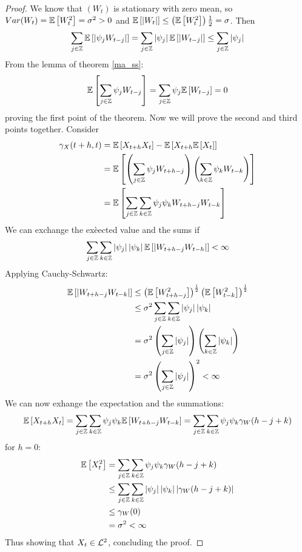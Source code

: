 \begin{proof}
    We know that $(W_t)$ is stationary with zero mean, so $Var(W_t)=\mathbb{E}\left[W_t^2\right]=\sigma^2>0$ and $\mathbb{E}\left[\left|W_t\right|\right]\le\left(\mathbb{E}\left[W_t^2\right]\right)\frac{1}{2}=\sigma$. Then
    \[
        \sum_{j\in\mathbb{Z}}\mathbb{E}\left[\left|\psi_jW_{t-j}\right|\right]=\sum_{j\in\mathbb{Z}}\left|\psi_j\right|\mathbb{E}\left[\left|W_{t-j}\right|\right]\le\sum_{j\in\mathbb{Z}}\left|\psi_j\right|  
    \]
    From the lemma of theorem \ref{ma_ss}:
    \[
        \mathbb{E}\left[\sum_{j\in\mathbb{Z}}\psi_jW_{t-j}\right]=\sum_{j\in\mathbb{Z}}\psi_j\mathbb{E}\left[W_{t-j}\right]=0  
    \]
    proving the first point of the theorem. Now we will prove the second and third points together. Consider
    \begin{equation*}
        \begin{split}
            \gamma_X(t+h,t)&=\mathbb{E}\left[X_{t+h}X_t\right]-\mathbb{E}\left[X_{t+h}\mathbb{E}\left[X_t\right]\right]\\
            &=\mathbb{E}\left[\left(\sum_{j\in\mathbb{Z}}\psi_jW_{t+h-j}\right)\left(\sum_{k\in\mathbb{Z}}\psi_kW_{t-k}\right)\right]\\
            &=\mathbb{E}\left[\sum_{j\in\mathbb{Z}}\sum_{k\in\mathbb{Z}}\psi_j\psi_kW_{t+h-j}W_{t-k}\right]\\
        \end{split}
    \end{equation*}
    We can exchange the exèected value and the sums if
    \[
        \sum_{j\in\mathbb{Z}}\sum_{k\in\mathbb{Z}}\left|\psi_j\right|\left|\psi_k\right|\mathbb{E}\left[\left|W_{t+h-j}W_{t-h}\right|\right]<\infty  
    \]
    Applying Cauchy-Schwartz:
    \begin{equation*}
        \begin{split}
            \mathbb{E}\left[\left|W_{t+h-j}W_{t-k}\right|\right]&\le\left(\mathbb{E}\left[W_{t+h-j}^2\right]\right)^\frac{1}{2}\left(\mathbb{E}\left[W_{t-k}^2\right]\right)^\frac{1}{2}\\
            &\le\sigma^2\sum_{j\in\mathbb{Z}}\sum_{k\in\mathbb{Z}}\left|\psi_j\right|\left|\psi_k\right|\\
            &=\sigma^2\left(\sum_{j\in\mathbb{Z}}\left|\psi_j\right|\right)\left(\sum_{k\in\mathbb{Z}}\left|\psi_k\right|\right)\\
            &=\sigma^2\left(\sum_{j\in\mathbb{Z}}\left|\psi_j\right|\right)^2<\infty\\
        \end{split}
    \end{equation*}
    We can now exhange the expectation and the summations:
    \[
        \mathbb{E}\left[X_{t+h}X_t\right]=\sum_{j\in\mathbb{Z}}\sum_{k\in\mathbb{Z}}\psi_j\psi_k\mathbb{E}\left[W_{t+h-j}W_{t-k}\right]=\sum_{j\in\mathbb{Z}}\sum_{k\in\mathbb{Z}}\psi_j\psi_k\gamma_W(h-j+k)
    \] 
    for $h=0$:
    \begin{equation*}
        \begin{split}
            \mathbb{E}\left[X_t^2\right]&=\sum_{j\in\mathbb{Z}}\sum_{k\in\mathbb{Z}}\psi_j\psi_k\gamma_W(h-j+k)\\
            &\le\sum_{j\in\mathbb{Z}}\sum_{k\in\mathbb{Z}}\left|\psi_j\right|\left|\psi_k\right|\left|\gamma_W(h-j+k)\right|\\
            &\le\gamma_W(0)\\
            &=\sigma^2 <\infty\\
        \end{split}
    \end{equation*}
    Thus showing that $X_t\in\mathcal{L}^{2}$, concluding the proof.
\end{proof}

